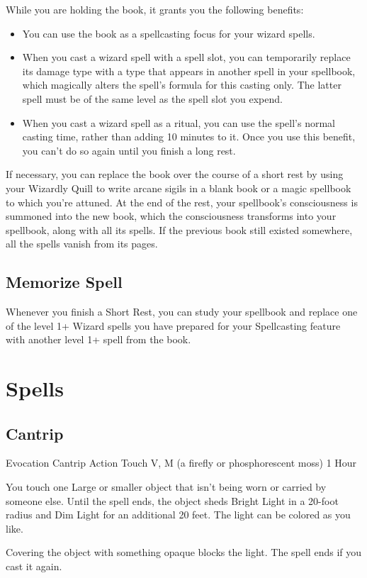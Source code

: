 \documentclass[letterpaper,openany,oneside,twocolumn]{book}
\begin{document}
While you are holding the book, it grants you the following benefits:
\begin{itemize}
	\item You can use the book as a spellcasting focus for your wizard spells.
	\item When you cast a wizard spell with a spell slot, you can temporarily replace its damage type with a type that appears in another spell in your spellbook, which magically alters the spell's formula for this casting only. The latter spell must be of the same level as the spell slot you expend.
	\item When you cast a wizard spell as a ritual, you can use the spell's normal casting time, rather than adding 10 minutes to it. Once you use this benefit, you can't do so again until you finish a long rest.
\end{itemize}
If necessary, you can replace the book over the course of a short rest by using your Wizardly Quill to write arcane sigils in a blank book or a magic spellbook to which you're attuned. At the end of the rest, your spellbook's consciousness is summoned into the new book, which the consciousness transforms into your spellbook, along with all its spells. If the previous book still existed somewhere, all the spells vanish from its pages.
\subsection*{Memorize Spell}
Whenever you finish a Short Rest, you can study your spellbook and replace one of the level 1+ Wizard spells you have prepared for your Spellcasting feature with another level 1+ spell from the book.

\section*{Spells}
\subsection*{Cantrip}

	{Evocation Cantrip}
	{Action}
	{Touch}
	{V, M (a firefly or phosphorescent moss)}
	{1 Hour}

You touch one Large or smaller object that isn't being worn or carried by someone else. Until the spell ends, the object sheds Bright Light in a 20-foot radius and Dim Light for an additional 20 feet. The light can be colored as you like.

Covering the object with something opaque blocks the light. The spell ends if you cast it again.
\end{document}
